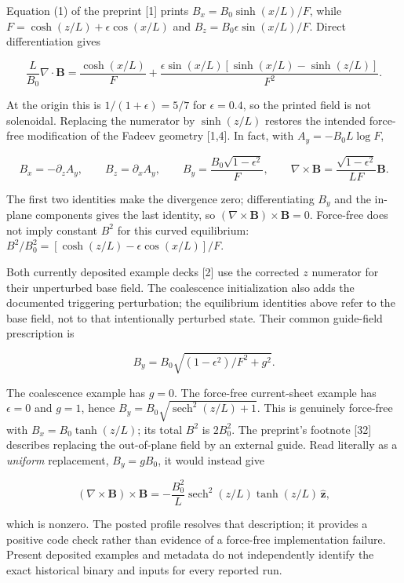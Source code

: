 Equation (1) of the preprint {[}1{]} prints \(B_x=B_0\sinh(x/L)/F\),
while \(F=\cosh(z/L)+\epsilon\cos(x/L)\) and
\(B_z=B_0\epsilon\sin(x/L)/F\). Direct differentiation gives

\[
\frac{L}{B_0}\nabla\cdot\mathbf B
=\frac{\cosh(x/L)}F+
\frac{\epsilon\sin(x/L)[\sinh(x/L)-\sinh(z/L)]}{F^2}.
\]

At the origin this is \(1/(1+\epsilon)=5/7\) for \(\epsilon=0.4\), so
the printed field is not solenoidal. Replacing the numerator by
\(\sinh(z/L)\) restores the intended force-free modification of the
Fadeev geometry {[}1,4{]}. In fact, with \(A_y=-B_0L\log F\),

\[
B_x=-\partial_zA_y,\qquad B_z=\partial_xA_y,\qquad
B_y=\frac{B_0\sqrt{1-\epsilon^2}}F,
\qquad
\nabla\times\mathbf B=
\frac{\sqrt{1-\epsilon^2}}{LF}\mathbf B.
\]

The first two identities make the divergence zero; differentiating
\(B_y\) and the in-plane components gives the last identity, so
\((\nabla\times\mathbf B)\times\mathbf B=0\). Force-free does not imply
constant \(B^2\) for this curved equilibrium:
\(B^2/B_0^2=[\cosh(z/L)-\epsilon\cos(x/L)]/F\).

Both currently deposited example decks {[}2{]} use the corrected \(z\)
numerator for their unperturbed base field. The coalescence
initialization also adds the documented triggering perturbation; the
equilibrium identities above refer to the base field, not to that
intentionally perturbed state. Their common guide-field prescription is

\[
B_y=B_0\sqrt{(1-\epsilon^2)/F^2+g^2}.
\]

The coalescence example has \(g=0\). The force-free current-sheet
example has \(\epsilon=0\) and \(g=1\), hence
\(B_y=B_0\sqrt{\operatorname{sech}^2(z/L)+1}\). This is genuinely
force-free with \(B_x=B_0\tanh(z/L)\); its total \(B^2\) is \(2B_0^2\).
The preprint's footnote {[}32{]} describes replacing the out-of-plane
field by an external guide. Read literally as a \emph{uniform}
replacement, \(B_y=gB_0\), it would instead give

\[
(\nabla\times\mathbf B)\times\mathbf B
=-\frac{B_0^2}{L}\operatorname{sech}^2(z/L)
\tanh(z/L)\,\hat{\mathbf z},
\]

which is nonzero. The posted profile resolves that description; it
provides a positive code check rather than evidence of a force-free
implementation failure. Present deposited examples and metadata do not
independently identify the exact historical binary and inputs for every
reported run.

